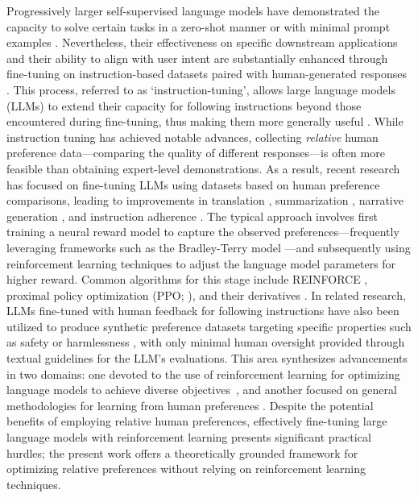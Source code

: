 Progressively larger self-supervised language models have demonstrated the capacity to solve certain tasks in a zero-shot manner \citep{radford2019language} or with minimal prompt examples \citep{gpt3,megatron,chowdhery2022palm}. Nevertheless, their effectiveness on specific downstream applications and their ability to align with user intent are substantially enhanced through fine-tuning on instruction-based datasets paired with human-generated responses \citep{mishra-etal-2022-cross,sanh2022multitask,chung2022scaling,thoppilan2022lamda}. This process, referred to as `instruction-tuning', allows large language models (LLMs) to extend their capacity for following instructions beyond those encountered during fine-tuning, thus making them more generally useful \citep{chung2022scaling}. While instruction tuning has achieved notable advances, collecting \textit{relative} human preference data—comparing the quality of different responses—is often more feasible than obtaining expert-level demonstrations. As a result, recent research has focused on fine-tuning LLMs using datasets based on human preference comparisons, leading to improvements in translation \citep{kreutzer-etal-2018-reliability}, summarization \citep{stiennon2022learning,ziegler2020finetuning}, narrative generation \citep{ziegler2020finetuning}, and instruction adherence \citep{ouyang2022training,ramamurthy2023is}. The typical approach involves first training a neural reward model to capture the observed preferences—frequently leveraging frameworks such as the Bradley-Terry model \citep{bradley1952rankanalysis}—and subsequently using reinforcement learning techniques to adjust the language model parameters for higher reward. Common algorithms for this stage include REINFORCE \citep{williams1992reinforce}, proximal policy optimization (PPO; \cite{schulman2017proximal}), and their derivatives \citep{ramamurthy2023is}. In related research, LLMs fine-tuned with human feedback for following instructions have also been utilized to produce synthetic preference datasets targeting specific properties such as safety or harmlessness \citep{bai2022constitutional}, with only minimal human oversight provided through textual guidelines for the LLM’s evaluations. This area synthesizes advancements in two domains: one devoted to the use of reinforcement learning for optimizing language models to achieve diverse objectives~\citep{Ranzato2015SequenceLT,paulus2018a,wu2018learning}, and another focused on general methodologies for learning from human preferences \citep{christiano2017deep,kupcsik2018learning}. Despite the potential benefits of employing relative human preferences, effectively fine-tuning large language models with reinforcement learning presents significant practical hurdles; the present work offers a theoretically grounded framework for optimizing relative preferences without relying on reinforcement learning techniques.

